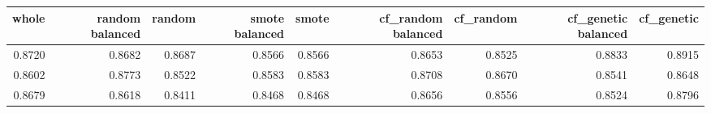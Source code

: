 \begin{tabular}{rrrrrrrrr}
\toprule

 whole &  random balanced &  random &  smote balanced &  smote &  cf\_random balanced &  cf\_random &  cf\_genetic balanced &  cf\_genetic \\
\midrule

0.8720 &           0.8682 &  0.8687 &          0.8566 & 0.8566 &              0.8653 &     0.8525 &               0.8833 &      0.8915 \\
0.8602 &           0.8773 &  0.8522 &          0.8583 & 0.8583 &              0.8708 &     0.8670 &               0.8541 &      0.8648 \\
0.8679 &           0.8618 &  0.8411 &          0.8468 & 0.8468 &              0.8656 &     0.8556 &               0.8524 &      0.8796 \\

\bottomrule
\end{tabular}
